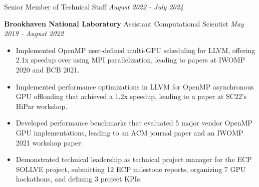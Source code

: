 \noindent
{Senior Member of Technical Staff} \hfill \textit{August 2022 - July 2024}
\begin{itemize}[itemsep=-0.1em]
\myExpTwo 
\end{itemize}

\newcommand{\myExpThree}{
   \item Implemented OpenMP user-defined multi-GPU scheduling for LLVM, offering 2.1x speedup over using MPI parallelization, leading to papers at IWOMP 2020 and BCB 2021.
   \item Implemented performance optimizations in LLVM for OpenMP asynchronous GPU offloading that achieved a 1.2x speedup, leading to a paper at SC22's HiPar workshop. 
   \item Developed performance benchmarks that evaluated 5 major vendor OpenMP GPU implementations, leading to an ACM journal paper and an IWOMP 2021 workshop paper. 
   \item Demonstrated technical leadership as technical project manager for the ECP SOLLVE project, submitting 12 ECP milestone reports, organizing 7 GPU hackathons, and defining 3 project KPIs.
   }
\noindent
\textbf{Brookhaven National Laboratory}\hfill
{Assistant Computational Scientist} \hfill \textit{May 2019 - August 2022}
\begin{itemize}[itemsep=-0.1em]
\myExpThree
\end{itemize}



